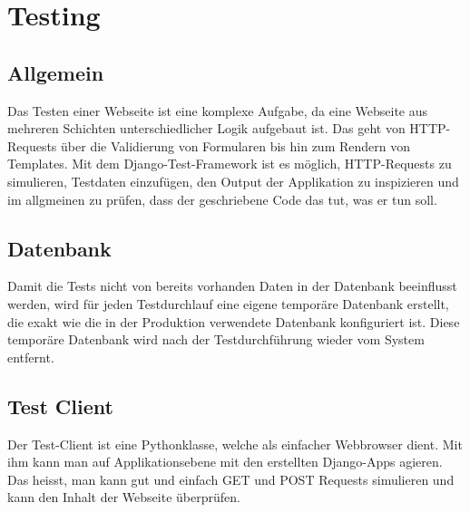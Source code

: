 

\section{Testing}

\subsection{Allgemein}
Das Testen einer Webseite ist eine komplexe Aufgabe, da eine Webseite aus mehreren Schichten unterschiedlicher Logik aufgebaut ist. Das geht von HTTP-Requests über die Validierung von Formularen bis hin zum Rendern von Templates. Mit dem Django-Test-Framework ist es möglich, HTTP-Requests zu simulieren, Testdaten einzufügen, den Output der Applikation zu inspizieren und im allgmeinen zu prüfen, dass der geschriebene Code das tut, was er tun soll.

\subsection{Datenbank}
Damit die Tests nicht von bereits vorhanden Daten in der Datenbank beeinflusst werden, wird für jeden Testdurchlauf eine eigene temporäre Datenbank erstellt, die exakt wie die in der Produktion verwendete Datenbank konfiguriert ist. Diese temporäre Datenbank wird nach der Testdurchführung wieder vom System entfernt.

\subsection{Test Client}
Der Test-Client ist eine Pythonklasse, welche als einfacher Webbrowser dient. Mit ihm kann man auf Applikationsebene mit den erstellten Django-Apps agieren. Das heisst, man kann gut und einfach GET und POST Requests simulieren und kann den Inhalt der Webseite überprüfen. 